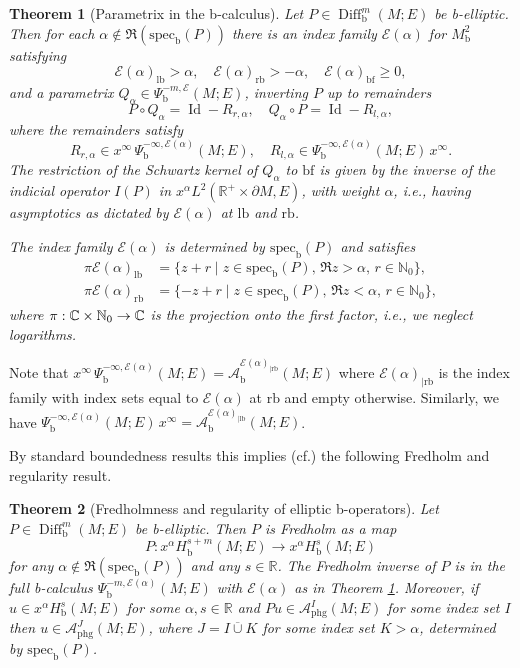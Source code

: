 \documentclass[11pt]{article}
\newcommand{\ie}{i.e.,\xspace}
\newcommand{\cf}{cf.\xspace}
\newcommand{\skpt}{\smallskip}
\numberwithin{equation}{section}
\theoremstyle{plain}
\newtheorem{Th}{Theorem}[section]
\theoremstyle{definition}
\newcommand {\N}{\mathbb{N}}
\newcommand{\R}{{\mathbb{R}}}
\newcommand\calA{{\mathcal A}}
\newcommand\calE{{\mathcal E}}
\newcommand {\phg}{{\mathrm{phg}}}
\newcommand{\lf}{{\mathrm{lb}}}
\newcommand{\rf}{{\mathrm{rb}}}
\newcommand{\bb}{{\mathrm{b}}}
\newcommand{\bbf}{{\mathrm{bf}}}
\newcommand{\specb}{\mathrm{spec}_\bb}
\DeclareMathOperator{\Diff}{Diff}
\DeclareMathOperator{\Id}{Id}
\newcommand{\dM}{{\partial M}}
\newcommand{\ocup}{\mathbin{\overline{\cup}}}
\begin{document}
\begin{Th}[Parametrix in the b-calculus] \label{thm: b-parametrix}
Let $P \in \Diff^m_\bb(M; E)$ be b-elliptic. Then for each $\alpha \notin \Re (\specb(P))$
there is an index family $\calE(\alpha)$ for $M^2_\bb$ satisfying
\[
\calE(\alpha)_{\lf} > \alpha,\quad \calE(\alpha)_{\rf} > -\alpha,\quad \calE(\alpha)_{\bbf} \geq 0,
\]
and a parametrix
$Q_{\alpha} \in \Psi_\bb^{-m, \calE}(M; E)$,
inverting $P$ up to remainders
\[
P \circ Q_{\alpha} = \Id - R_{r,\alpha},\quad Q_{\alpha} \circ P= \Id - R_{l,\alpha},
\]
where the remainders satisfy
\[
R_{r,\alpha} \in x^\infty\,\Psi_\bb^{-\infty,\calE(\alpha)} (M;E)
,\quad
R_{l,\alpha} \in \Psi_\bb^{-\infty,\calE(\alpha)}(M;E)\,x^\infty.
\]
The restriction of the Schwartz kernel of $Q_{\alpha}$ to $\bbf$ is given by the inverse of the
indicial operator $I(P)$ in $x^\alpha L^2(\R^+ \times \dM, E)$, with weight $\alpha$, \ie having asymptotics as dictated by $\calE(\alpha)$ at $\lf$ and $\rf$.

The index family $\calE(\alpha)$ is determined by $\specb(P)$
and satisfies
\begin{equation}
\label{eqn:index sets}
\begin{split}
\pi\calE(\alpha)_\lf &= \{z+r \mid z\in \specb(P),\,\Re z >\alpha,\,r\in\N_0\},\\
\pi\calE(\alpha)_\rf &= \{-z+r \mid z\in \specb(P),\,\Re z <\alpha,\,r\in\N_0\},
\end{split}
\end{equation}
where $\pi:\C\times\N_0\to\C$ is the projection onto the first factor, \ie we neglect logarithms.
\end{Th}

Note that $x^\infty\,\Psi_\bb^{-\infty,\calE(\alpha)}(M;E) = \calA_\bb^{\calE(\alpha)_{|\rf}}(M;E)$ where $\calE(\alpha)_{|\rf}$ is the index family with index sets equal to $\calE(\alpha)$ at $\rf$ and empty otherwise. Similarly, we have $\Psi_\bb^{-\infty,\calE(\alpha)} (M;E)\,x^\infty = \calA_\bb^{\calE(\alpha)_{|\lf}}(M;E)$.

By standard boundedness results this implies (\cf \cite[Th.\,5.60 and Prop. 5.61]{melrose1993atiyah})
the following Fredholm and regularity result.

\skpt
\begin{Th}[Fredholmness and regularity of elliptic b-operators]
\label{thm:b Fredholm regularity}
Let $P\in \Diff^m_\bb(M; E)$ be b-elliptic. Then $P$ is Fredholm as a map
\[
P:x^\alpha H^{s+m}_\bb(M; E) \to x^{\alpha}H^{s}_\bb(M; E)
\]
for any $\alpha \notin \Re (\specb (P))$ and any $s\in\R$. The Fredholm inverse of $P$ is in
the full b\nobreakdash-calculus $\Psi_\bb^{-m, \calE(\alpha)}(M; E)$ with $\calE(\alpha)$ as in Theorem
\ref{thm: b-parametrix}. Moreover, if $u \in x^\alpha H^s_\bb(M; E)$ for some $\alpha,s\in\R$ and
$Pu \in \mathcal{A}^I_{\phg}(M; E)$ for some index set $I$ then $u\in \mathcal{A}^J_{\phg}(M; E)$,
where $J = I \ocup K$ for some index set $K>\alpha$, determined by $\specb(P)$.
\end{Th}
\end{document}
